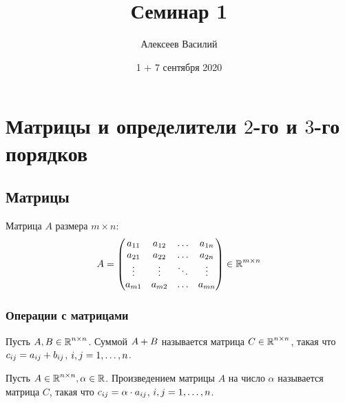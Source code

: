 \documentclass[a4paper,12pt]{article}
\author{Алексеев Василий}
\title{Семинар 1}
\date{1 + 7 сентября 2020}
\begin{document}
  \maketitle
  
  \tableofcontents

  \thispagestyle{empty}
  
  \newpage
  


  \section{Матрицы и определители $2$-го и $3$-го порядков}

  \subsection{Матрицы}

  Матрица $A$ размера $m \times n$:
  \[
    A = \begin{pmatrix}
      a_{11} & a_{12} & \ldots & a_{1n}\\
      a_{21} & a_{22} & \ldots & a_{2n}\\
      \vdots & \vdots & \ddots & \vdots\\
      a_{m1} & a_{m2} & \ldots & a_{mn}
    \end{pmatrix} \in \operatorname{\mathbb R}^{m \times n}
  \]
  
  
  \subsubsection{Операции с матрицами}
  
  \begin{definition}
    Пусть $A, B \in \operatorname{\mathbb R}^{n \times n}$.
    Суммой $A \hm+ B$ называется матрица $C \hm\in \RR^{n \times n}$, такая что
    $c_{ij} \hm= a_{ij} + b_{ij}$, $i, j \hm= 1, \ldots, n$.
  \end{definition}
  
  \begin{definition}
    Пусть $A \in \operatorname{\mathbb R}^{n \times n}, \alpha \in \operatorname{\mathbb R}$.
    Произведением матрицы $A$ на число $\alpha$ называется матрица $C$, такая что
    $c_{ij} \hm= \alpha \cdot a_{ij}$, $i, j \hm= 1, \ldots, n$.
  \end{definition}
  
\end{document}

